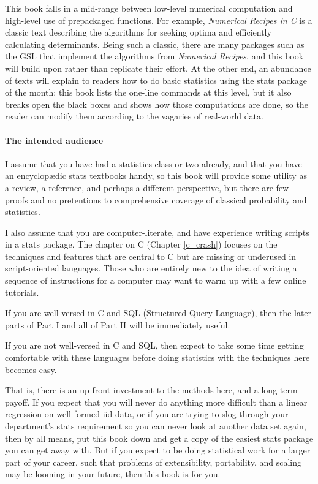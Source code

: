 \documentclass[12pt,notitlepage, openany]{book}
\def\ind#1{\index{#1}#1}
\begin{document}
\begin{multicols}{2}
This book falls in a mid-range between low-level numerical
computation and high-level use of prepackaged functions. For example,
{\sl Numerical Recipes in C} \citep{recipesinc} is a classic text
describing the algorithms for seeking optima and efficiently calculating
determinants. Being such a classic, there are many packages such as the
GSL that implement the algorithms from {\sl Numerical Recipes}, and this
book will build upon rather than replicate their effort. At the other
end, an abundance of texts will explain to readers how to do basic
statistics using the stats package of the month; this book lists the
one-line commands at this level, but it also breaks open the black boxes
and shows how those computations are done, so the reader can modify them
according to the vagaries of real-world data.

\paragraph{The intended audience}
I assume that you have had a statistics class or two already, and that
you have an encyclop\ae{}dic stats textbooks handy, so this
book will provide some utility as a review, a reference, and perhaps a
different perspective,
but there are few proofs and no pretentions to comprehensive coverage of
classical probability and statistics.

I also assume that you are computer-literate, and have experience writing
scripts in a stats package. The chapter on C (Chapter \ref{c_crash})
focuses on the techniques and features that are central to C but are
missing or underused in script-oriented languages. Those who are entirely
new to the idea of writing a sequence of instructions for a computer
may want to warm up with a few online tutorials.

If you are well-versed in C and SQL (Structured Query Language), then
the later parts of Part I and all of Part II will be immediately useful.

If you are not well-versed in C and SQL, then expect to take some 
time getting comfortable with these languages before doing statistics
with the techniques here becomes easy.

That is, there is an up-front investment to the methods here, and a
long-term payoff. If you expect that you will never do anything more
difficult than a linear regression on well-formed \ind{iid} data, or
if you are trying to slog through your department's stats requirement
so you can never look at another data set again, then by all means, put
this book down and get a copy of the easiest stats package you can get
away with. But if you expect to be doing statistical work for a larger
part of your career, such that problems of extensibility, portability,
and scaling may be looming in your future, then this book is for you.



\end{multicols}
\end{document}
